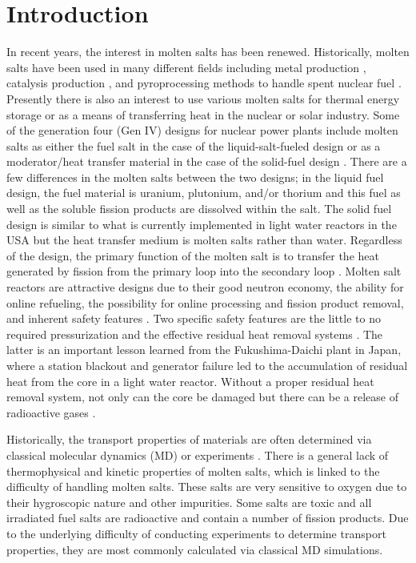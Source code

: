 \documentclass[review]{elsarticle}
\begin{document}
\section{Introduction}
In recent years, the interest in molten salts has been renewed. Historically, molten salts have been used in many different fields including metal production \cite{Zhu2014, VAHIDI2018178}, catalysis production \cite{JIN20202382, HU20204244}, and pyroprocessing methods to handle spent nuclear fuel \cite{CHOI2015572, osti_22107867}. Presently there is also an interest to use various molten salts for thermal energy storage or as a means of transferring heat in the nuclear or solar industry. Some of the generation four (Gen IV) designs for nuclear power plants include molten salts as either the fuel salt in the case of the liquid-salt-fueled design \cite{doi:10.1080/00295450.2019.1586372} or as a moderator/heat transfer material in the case of the solid-fuel design \cite{doi:10.13182/NSE90-374}. There are a few differences in the molten salts between the two designs; in the liquid fuel design, the fuel material is uranium, plutonium, and/or thorium and this fuel as well as the soluble fission products are dissolved within the salt. The solid fuel design is similar to what is currently implemented in light water reactors in the USA but the heat transfer medium is molten salts rather than water. Regardless of the design, the primary function of the molten salt is to transfer the heat generated by fission from the primary loop into the secondary loop \cite{gakhar2021molten}. Molten salt reactors are attractive designs due to their good neutron economy, the ability for online refueling, the possibility for online processing and fission product removal, and inherent safety features \cite{leblanc2010molten}. Two specific safety features are the little to no required pressurization \cite{leblanc2017integral} and the effective residual heat removal systems \cite{SUN2014149}. The latter is an important lesson learned from the Fukushima-Daichi plant in Japan, where a station blackout and generator failure led to the accumulation of residual heat from the core in a light water reactor. Without a proper residual heat removal system, not only can the core be damaged but there can be a release of radioactive gases \cite{SUN2014149}.
 


Historically, the transport properties of materials are often determined via classical molecular dynamics (MD) or experiments \cite{WANG2014262}. There is a general lack of thermophysical and kinetic properties of molten salts, which is linked to the difficulty of handling molten salts. These salts are very sensitive to oxygen due to their hygroscopic nature and other impurities. Some salts are toxic and all irradiated fuel salts are radioactive and contain a number of fission products. Due to the underlying difficulty of conducting experiments to determine transport properties, they are most commonly calculated via classical MD simulations. 
\end{document}
